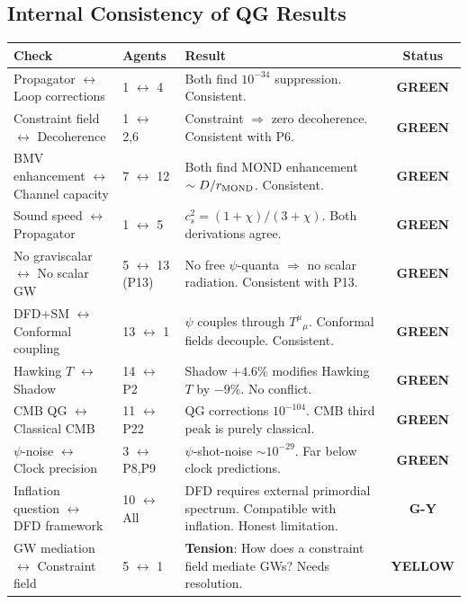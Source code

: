 \documentclass[11pt,a4paper]{article}
\newcommand{\GREEN}{\textcolor{dfdgreen}{\textbf{GREEN}}}
\newcommand{\YELLOW}{\textcolor{dfdyellow}{\textbf{YELLOW}}}
\newcommand{\GY}{\textcolor{dfdgy}{\textbf{G-Y}}}
\begin{document}
\subsection{Internal Consistency of QG Results}
\label{sec:internal-consistency}

\begin{center}
\begin{longtable}{p{3cm}p{3cm}p{5cm}c}
\toprule
\textbf{Check} & \textbf{Agents} & \textbf{Result} & \textbf{Status} \\
\midrule
\endfirsthead
Propagator $\leftrightarrow$ Loop corrections & 1 $\leftrightarrow$ 4 & Both find $10^{-34}$ suppression. Consistent. & \GREEN \\
Constraint field $\leftrightarrow$ Decoherence & 1 $\leftrightarrow$ 2,6 & Constraint $\Rightarrow$ zero decoherence. Consistent with P6. & \GREEN \\
BMV enhancement $\leftrightarrow$ Channel capacity & 7 $\leftrightarrow$ 12 & Both find MOND enhancement $\sim D/r_{\rm MOND}$. Consistent. & \GREEN \\
Sound speed $\leftrightarrow$ Propagator & 1 $\leftrightarrow$ 5 & $c_s^2 = (1+\chi)/(3+\chi)$. Both derivations agree. & \GREEN \\
No graviscalar $\leftrightarrow$ No scalar GW & 5 $\leftrightarrow$ 13 (P13) & No free $\psi$-quanta $\Rightarrow$ no scalar radiation. Consistent with P13. & \GREEN \\
DFD+SM $\leftrightarrow$ Conformal coupling & 13 $\leftrightarrow$ 1 & $\psi$ couples through $T^\mu{}_\mu$. Conformal fields decouple. Consistent. & \GREEN \\
Hawking $T$ $\leftrightarrow$ Shadow & 14 $\leftrightarrow$ P2 & Shadow $+4.6\%$ modifies Hawking $T$ by $-9\%$. No conflict. & \GREEN \\
CMB QG $\leftrightarrow$ Classical CMB & 11 $\leftrightarrow$ P22 & QG corrections $10^{-104}$. CMB third peak is purely classical. & \GREEN \\
$\psi$-noise $\leftrightarrow$ Clock precision & 3 $\leftrightarrow$ P8,P9 & $\psi$-shot-noise $\sim 10^{-29}$. Far below clock predictions. & \GREEN \\
Inflation question $\leftrightarrow$ DFD framework & 10 $\leftrightarrow$ All & DFD requires external primordial spectrum. Compatible with inflation. Honest limitation. & \GY \\
GW mediation $\leftrightarrow$ Constraint field & 5 $\leftrightarrow$ 1 & \textbf{Tension}: How does a constraint field mediate GWs? Needs resolution. & \YELLOW \\
\bottomrule
\end{longtable}
\end{center}
\end{document}
